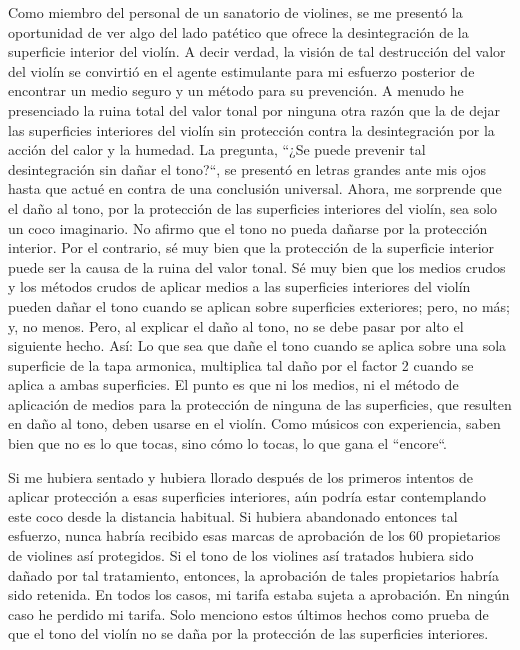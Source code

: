 \documentclass[12pt]{book}
\begin{document}
Como miembro del personal de un sanatorio de violines, se me presentó la oportunidad de ver algo del lado patético que ofrece la desintegración de la superficie interior del violín. A decir verdad, la visión de tal destrucción del valor del violín se convirtió en el agente estimulante para mi esfuerzo posterior de encontrar un medio seguro y un método para su prevención. A menudo he presenciado la ruina total del valor tonal por ninguna otra razón que la de dejar las superficies interiores del violín sin protección contra la desintegración por la acción del calor y la humedad. La pregunta, ``¿Se puede prevenir tal desintegración sin dañar el tono?``, se presentó en letras grandes ante mis ojos hasta que actué en contra de una conclusión universal. Ahora, me sorprende que el daño al tono, por la protección de las superficies interiores del violín, sea solo un coco imaginario. No afirmo que el tono no pueda dañarse por la protección interior. Por el contrario, sé muy bien que la protección de la superficie interior puede ser la causa de la ruina del valor tonal. Sé muy bien que los medios crudos y los métodos crudos de aplicar medios a las superficies interiores del violín pueden dañar el tono cuando se aplican sobre superficies exteriores; pero, no más; y, no menos. Pero, al explicar el daño al tono, no se debe pasar por alto el siguiente hecho. Así: Lo que sea que dañe el tono cuando se aplica sobre una sola superficie de la tapa armonica, multiplica tal daño por el factor 2 cuando se aplica a ambas superficies. El punto es que ni los medios, ni el método de aplicación de medios para la protección de ninguna de las superficies, que resulten en daño al tono, deben usarse en el violín. Como músicos con experiencia, saben bien que no es lo que tocas, sino cómo lo tocas, lo que gana el ``encore``.

Si me hubiera sentado y hubiera llorado después de los primeros intentos de aplicar protección a esas superficies interiores, aún podría estar contemplando este coco desde la distancia habitual. Si hubiera abandonado entonces tal esfuerzo, nunca habría recibido esas marcas de aprobación de los 60 propietarios de violines así protegidos. Si el tono de los violines así tratados hubiera sido dañado por tal tratamiento, entonces, la aprobación de tales propietarios habría sido retenida. En todos los casos, mi tarifa estaba sujeta a aprobación. En ningún caso he perdido mi tarifa. Solo menciono estos últimos hechos como prueba de que el tono del violín no se daña por la protección de las superficies interiores.
\end{document}
